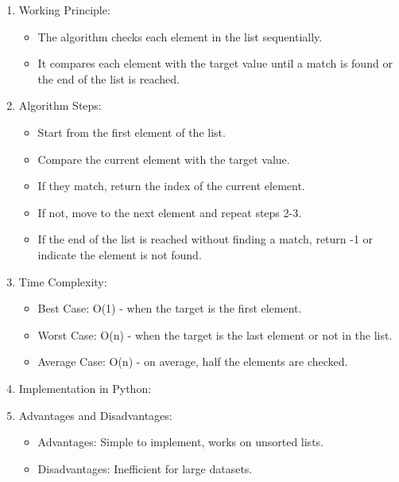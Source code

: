 \begin{enumerate}
\def\labelenumi{\arabic{enumi}.}
\item
  Working Principle:

  \begin{itemize}
  \tightlist
  \item
    The algorithm checks each element in the list sequentially.
  \item
    It compares each element with the target value until a match is
    found or the end of the list is reached.
  \end{itemize}
\item
  Algorithm Steps:

  \begin{itemize}
  \tightlist
  \item
    Start from the first element of the list.
  \item
    Compare the current element with the target value.
  \item
    If they match, return the index of the current element.
  \item
    If not, move to the next element and repeat steps 2-3.
  \item
    If the end of the list is reached without finding a match, return -1
    or indicate the element is not found.
  \end{itemize}
\item
  Time Complexity:

  \begin{itemize}
  \tightlist
  \item
    Best Case: O(1) - when the target is the first element.
  \item
    Worst Case: O(n) - when the target is the last element or not in the
    list.
  \item
    Average Case: O(n) - on average, half the elements are checked.
  \end{itemize}
\item
  Implementation in Python:

\begin{Shaded}
\begin{Highlighting}[]
     \NormalTok{(}
        \OperatorTok{==}
     \OperatorTok{{-}}
\end{Highlighting}
\end{Shaded}
\item
  Advantages and Disadvantages:

  \begin{itemize}
  \tightlist
  \item
    Advantages: Simple to implement, works on unsorted lists.
  \item
    Disadvantages: Inefficient for large datasets.
  \end{itemize}
\end{enumerate}

